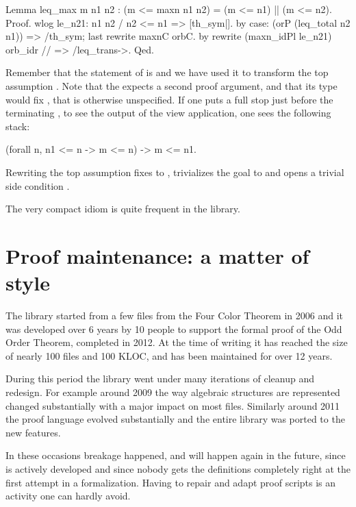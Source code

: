 \begin{coq}{}{}
Lemma leq_max m n1 n2 : (m <= maxn n1 n2) = (m <= n1) || (m <= n2).
Proof.
wlog le_n21: n1 n2 / n2 <= n1 => [th_sym|].
  by case: (orP (leq_total n2 n1)) => /th_sym; last rewrite maxnC orbC.
by rewrite (maxn_idPl le_n21) orb_idr // => /leq_trans->.
Qed.
\end{coq}

Remember that the statement of
 is  and
we have used it to transform the top assumption .  Note that
the  expects a second proof argument, and that its type
would fix , that is otherwise unspecified.  If one puts a
full stop just before the terminating \C{->}, to see the output of
the view application, one sees the following stack:

\begin{coq}{}{}
(forall n, n1 <= n -> m <= n) -> m <= n1.
\end{coq}

Rewriting the top assumption fixes  to , trivializes
the goal  to  and opens a trivial side
condition .

The very compact idiom  is quite frequent in the
\mcbMC{} library.

\section{Proof maintenance: a matter of style}

The \mcbMC{} library started from a few files from the Four Color
Theorem in 2006 and it was developed over 6 years by 10 people to
support the formal proof of the Odd Order Theorem, completed in 2012.
At the time of writing it has reached the size of nearly 100 files and
100 KLOC, and has been maintained for over 12 years.

During this period the library went under many iterations of cleanup
and redesign.
For example around 2009 the way algebraic structures are represented
changed substantially with a major impact on most files. Similarly
around 2011 the \mcbSSR{} proof language evolved substantially and the
entire library was ported to the new features.

In these occasions breakage happened, and will happen again in the future,
since \Coq{} is actively developed and since nobody gets the definitions
completely right at the first attempt in a formalization. Having to
repair and adapt proof scripts is an activity one can hardly avoid.

